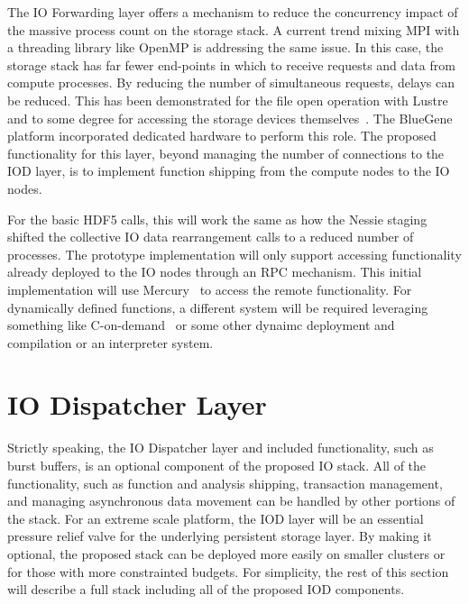 \documentclass[conference]{IEEEtran}
\begin{document}
The IO Forwarding layer offers a mechanism to reduce the concurrency impact of
the massive process count on the storage stack. A current trend mixing MPI with
a threading library like OpenMP is addressing the same issue. In this case,
the storage stack has far fewer end-points in which to receive requests and
data from compute processes. By reducing the number of simultaneous requests,
delays can be reduced. This has been demonstrated for the file open operation
with Lustre~\cite{lofstead:2009:adaptable} and to some degree for accessing the
storage devices themselves~\cite{lofstead:2010:io-variability}. The BlueGene
platform incorporated dedicated hardware to perform this role. The proposed
functionality for this layer, beyond managing the number of connections to
the IOD layer, is to implement function shipping from the compute nodes to the
IO nodes.

For the basic HDF5 calls, this will work the same as how the Nessie
staging~\cite{lofstead:2011:nessie-staging} shifted the collective IO data
rearrangement calls to a reduced number of processes. The prototype
implementation will only support accessing functionality already deployed to
the IO nodes through an RPC mechanism. This initial implementation will use
Mercury~\cite{Soumagne:2013:mercury} to access the remote functionality. For
dynamically defined functions, a different system will be required leveraging
something like C-on-demand~\cite{abbasi:2011:c-on-demand} or some other dynaimc
deployment and compilation or an interpreter system.

\section{IO Dispatcher Layer}
\label{sec:iod}

Strictly speaking, the IO Dispatcher layer and included functionality, such as
burst buffers, is an optional component of the proposed IO stack. All of the
functionality, such as function and analysis shipping, transaction management,
and managing asynchronous data movement can be handled by other portions of the
stack. For an extreme scale platform, the IOD layer will be an essential
pressure relief valve for the underlying persistent storage layer. By making it
optional, the proposed stack can be deployed more easily on smaller clusters or
for those with more constrainted budgets. For simplicity, the rest of this
section will describe a full stack including all of the proposed IOD
components.
\end{document}

